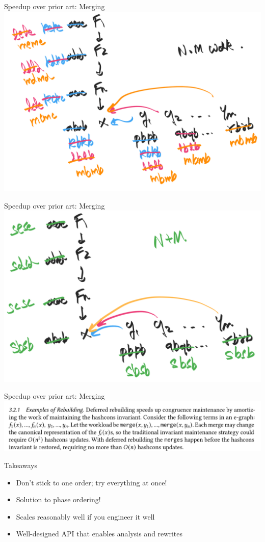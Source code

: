 \documentclass[8pt]{beamer}
\begin{document}
\begin{frame}[fragile]{Speedup over prior art: Merging}
\includegraphics[width=\textwidth]{./eg-2-4.png}
\end{frame}


\begin{frame}[fragile]{Speedup over prior art: Merging}
\includegraphics[width=\textwidth]{./eg-2-5.png}
\end{frame}


\begin{frame}[fragile]{Speedup over prior art: Merging}
\includegraphics[width=\textwidth]{./eg-2-paper-snippet.png}
\end{frame}


\begin{frame}[fragile]{Takeaways}
\begin{itemize}
\item Don't stick to one order; try everything at once!
\item Solution to phase ordering!
\item Scales reasonably well if you engineer it well
\item Well-designed API that enables analysis and rewrites
\end{itemize}
\end{frame}
\end{document}
